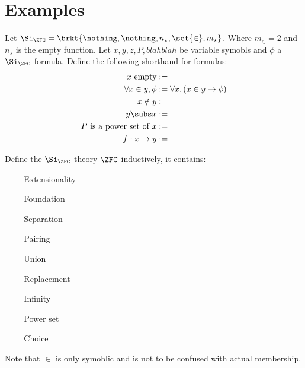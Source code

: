 \section{Examples}



\begin{dfn}
    Let $\Si_{\ZFC} = \brkt{\nothing, \nothing, n_\star, \set{\in}, m_\star}$.
    Where $m_\in = 2$ and $n_\star$ is the empty function.
    Let $x,y,z, P, blahblah$ be variable symobls and %
    $\phi$ a $\Si_\ZFC$-formula.%
    Define the following shorthand for formulas:
    \begin{align*}%
        x \text{ empty} &:= \\
        \forall x \in y, \phi &:= \forall x, (x \in y \to \phi)\\
        x \notin y &:=\\
        y \subs x &:= \\
        P \text{ is a power set of } x &:= \\
        f : x \to y &:= 
    \end{align*}
\end{dfn}

\begin{eg}[$\ZFC$]
    Define the $\Si_{\ZFC}$-theory $\ZFC$ inductively,
    it contains:
    \begin{itemize}
        \item[$\vert$] Extensionality
        \item[$\vert$] Foundation
        \item[$\vert$] Separation
        \item[$\vert$] Pairing
        \item[$\vert$] Union
        \item[$\vert$] Replacement
        \item[$\vert$] Infinity
        \item[$\vert$] Power set
        \item[$\vert$] Choice 
    \end{itemize}
    Note that $\in$ is only symoblic and is not to be confused with 
    actual membership.
\end{eg}

